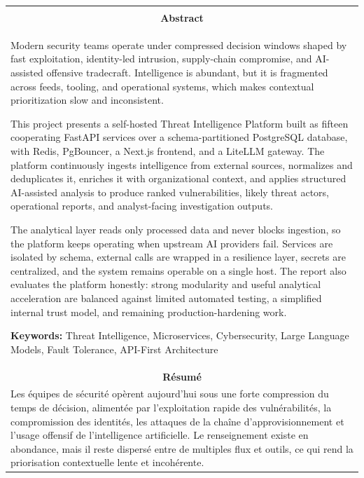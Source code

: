 \documentclass[a4paper,12pt]{report}
\begin{document}
\noindent
\begin{tabular}{|p{}|}
\hline
\\[0.6em]
\multicolumn{1}{|c|}{\textbf{\large Abstract}} \\[0.5em]
Modern security teams operate under compressed decision windows shaped by fast exploitation, identity-led intrusion, supply-chain compromise, and AI-assisted offensive tradecraft. Intelligence is abundant, but it is fragmented across feeds, tooling, and operational systems, which makes contextual prioritization slow and inconsistent.

\vspace{0.5em}
This project presents a self-hosted Threat Intelligence Platform built as fifteen cooperating FastAPI services over a schema-partitioned PostgreSQL database, with Redis, PgBouncer, a Next.js frontend, and a LiteLLM gateway. The platform continuously ingests intelligence from external sources, normalizes and deduplicates it, enriches it with organizational context, and applies structured AI-assisted analysis to produce ranked vulnerabilities, likely threat actors, operational reports, and analyst-facing investigation outputs.

\vspace{0.5em}
The analytical layer reads only processed data and never blocks ingestion, so the platform keeps operating when upstream AI providers fail. Services are isolated by schema, external calls are wrapped in a resilience layer, secrets are centralized, and the system remains operable on a single host. The report also evaluates the platform honestly: strong modularity and useful analytical acceleration are balanced against limited automated testing, a simplified internal trust model, and remaining production-hardening work.

\vspace{0.5em}
\textbf{Keywords:} Threat Intelligence, Microservices, Cybersecurity, Large Language Models, Fault Tolerance, API-First Architecture
\hline
\\[0.6em]
\multicolumn{1}{|c|}{\textbf{\large Résumé}} \\[0.5em]
Les équipes de sécurité opèrent aujourd'hui sous une forte compression du temps de décision, alimentée par l'exploitation rapide des vulnérabilités, la compromission des identités, les attaques de la chaîne d'approvisionnement et l'usage offensif de l'intelligence artificielle. Le renseignement existe en abondance, mais il reste dispersé entre de multiples flux et outils, ce qui rend la priorisation contextuelle lente et incohérente.


\end{tabular}
\end{document}
